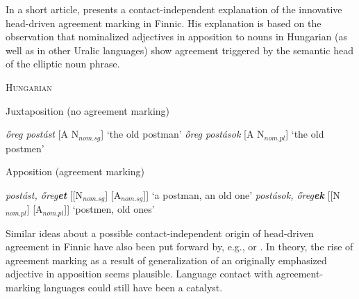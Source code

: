 {In a short article, \citet{mark1979} presents a contact-independent explanation of the innovative head-driven agreement marking in Finnic. His explanation is based on the observation that nominalized adjectives in apposition to nouns in Hungarian (as well as in other Uralic languages) show agreement triggered by the semantic head of the elliptic noun phrase.
\begin{exe}
\ex \textsc{Hungarian} \citep[209]{mark1979} \label{hung ap}
\begin{xlist}
\ex Juxtaposition (no agreement marking)
\begin{xlist}
\ex \textit{őreg postást} [A N$_{nom.sg}$] ‘the old postman’
\ex \textit{őreg postások} [A N$_{nom.pl}$] ‘the old postmen’
\end{xlist}
\ex Apposition (agreement marking)
\begin{xlist}
\ex \textit{postást, őreg\textbf{et}} [[N$_{nom.sg}$] [A$_{nom.sg}$]] ‘a postman, an old one’
\ex \textit{postások, őreg\textbf{ek}} [[N$_{nom.pl}$] [A$_{nom.pl}$]] ‘postmen, old ones’
\end{xlist}
\end{xlist}
\end{exe}
Similar ideas about a possible contact-independent origin of head-driven agreement in Finnic have also been put forward by, e.g., \cite{ravila1941} or \cite{papp1962}. In theory, the rise of agreement marking as a result of generalization of an originally emphasized adjective in apposition seems plausible. Language contact with agreement-marking languages could still have been a catalyst. 

}
